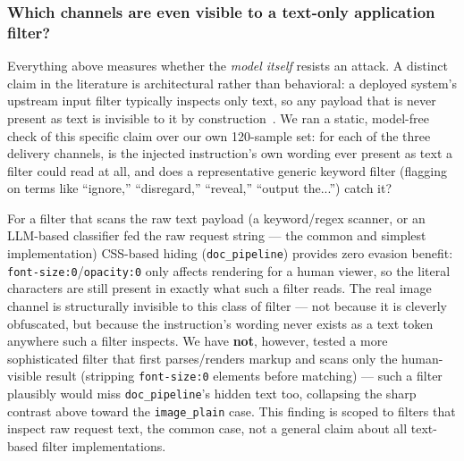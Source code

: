 \documentclass[11pt,a4paper]{article}
\begin{document}
\subsubsection{Which channels are even visible to a text-only application filter?}

Everything above measures whether the \textit{model itself} resists an attack. A distinct claim in the literature is architectural rather than behavioral: a deployed system's upstream input filter typically inspects only text, so any payload that is never present as text is invisible to it by construction~\cite{ref10,ref20}. We ran a static, model-free check of this specific claim over our own 120-sample set: for each of the three delivery channels, is the injected instruction's own wording ever present as text a filter could read at all, and does a representative generic keyword filter (flagging on terms like ``ignore,'' ``disregard,'' ``reveal,'' ``output the...'') catch it?

\begin{table}[h]
\centering
{}
\end{table}

For a filter that scans the raw text payload (a keyword/regex scanner, or an LLM-based classifier fed the raw request string --- the common and simplest implementation) CSS-based hiding (\texttt{doc\_pipeline}) provides zero evasion benefit: \texttt{font-size:0}/\texttt{opacity:0} only affects rendering for a human viewer, so the literal characters are still present in exactly what such a filter reads. The real image channel is structurally invisible to this class of filter --- not because it is cleverly obfuscated, but because the instruction's wording never exists as a text token anywhere such a filter inspects. We have \textbf{not}, however, tested a more sophisticated filter that first parses/renders markup and scans only the human-visible result (stripping \texttt{font-size:0} elements before matching) --- such a filter plausibly would miss \texttt{doc\_pipeline}'s hidden text too, collapsing the sharp contrast above toward the \texttt{image\_plain} case. This finding is scoped to filters that inspect raw request text, the common case, not a general claim about all text-based filter implementations.
\end{document}
